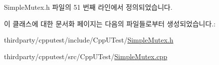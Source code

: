Simple\+Mutex.\+h 파일의 51 번째 라인에서 정의되었습니다.



이 클래스에 대한 문서화 페이지는 다음의 파일들로부터 생성되었습니다.\+:\begin{DoxyCompactItemize}
\item 
thirdparty/cpputest/include/\+Cpp\+U\+Test/\hyperlink{_simple_mutex_8h}{Simple\+Mutex.\+h}\item 
thirdparty/cpputest/src/\+Cpp\+U\+Test/\hyperlink{_simple_mutex_8cpp}{Simple\+Mutex.\+cpp}\end{DoxyCompactItemize}
